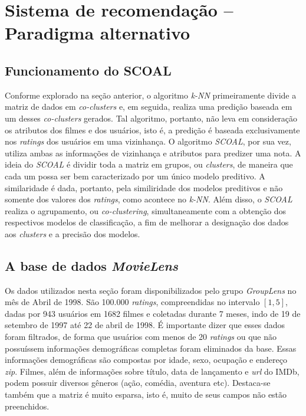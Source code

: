 \section{Sistema de recomendação – Paradigma alternativo}

\subsection{Funcionamento do SCOAL}

Conforme explorado na seção anterior, o algoritmo \textit{k-NN} primeiramente
divide a matriz de dados em \textit{co-clusters} e, em seguida, realiza uma
predição baseada em um desses \textit{co-clusters} gerados. Tal algoritmo,
portanto, não leva em consideração os atributos dos filmes e dos usuários, isto
é, a predição é baseada exclusivamente nos \textit{ratings} dos usuários em uma
vizinhança. O algoritmo \textit{SCOAL}, por sua vez, utiliza ambas as
informações de vizinhança e atributos para predizer uma nota. A ideia do
\textit{SCOAL} é dividir toda a matriz em grupos, ou \textit{clusters}, de
maneira que cada um possa ser bem caracterizado por um único modelo preditivo. A
similaridade é dada, portanto, pela similiridade dos modelos preditivos e não
somente dos valores dos \textit{ratings}, como acontece no \textit{k-NN}. Além
disso, o \textit{SCOAL} realiza o agrupamento, ou \textit{co-clustering}, simultaneamente
com a obtenção dos respectivos modelos de classificação, a fim de melhorar a
designação dos dados aos \textit{clusters} e a precisão dos modelos.

\subsection{A base de dados \textit{MovieLens}}

Os dados utilizados nesta seção foram disponibilizados pelo grupo
\textit{GroupLens} no mês de Abril de 1998. São 100.000 \textit{ratings},
compreendidas no intervalo \([1,5]\), dadas por 943 usuários em 1682 filmes e
coletadas durante 7 meses, indo de 19 de setembro de 1997 até 22 de abril de
1998. É importante dizer que esses dados foram filtrados, de forma que usuários
com menos de 20 \textit{ratings} ou que não possuíssem informações
demográficas completas foram eliminados da base. Essas informações demográficas
são compostas por idade, sexo, ocupação e endereço \textit{zip}. Filmes, além
de informações sobre título, data de lançamento e \textit{url} do IMDb,
podem possuir diversos gêneros (ação, comédia, aventura etc). Destaca-se também
que a matriz é muito esparsa, isto é, muito de seus campos não estão
preenchidos.

